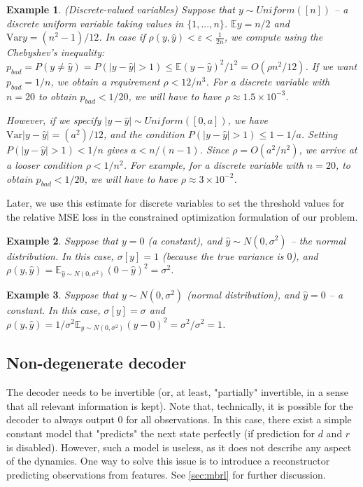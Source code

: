 \documentclass[a4paper,11pt,oneside]{report}
\newtheorem{example}{Example}[section]
\newcommand{\var}{\mbox{Var}}
\begin{document}
\begin{example}{(Discrete-valued variables)}
    Suppose that $y\sim Uniform([n])$ -- a discrete uniform variable taking values in $\{1,...,n\}$. $\mathbb Ey=n/2$ and $\var y=(n^2-1)/12$. In case if $\rho(y,\hat{y})<\varepsilon<\frac{1}{2n}$, we compute using the Chebyshev's inequality: $p_{bad}=P(y\neq \hat{y})=P(|y-\hat{y}|>1)\leq \mathbb E(y-\hat{y})^2/1^2=O(\rho n^2/12)$. If we want $p_{bad}=1/n$, we obtain a requirement $\rho<12/n^3$. For a discrete variable with $n=20$ to obtain $p_{bad}<1/20$, we will have to have $\rho\approx1.5\times 10^{-3}$.

    However, if we specify $|y-\hat{y}|\sim Uniform([0, a])$, we have $\var |y-\hat{y}|=(a^2)/12$, and the condition $P(|y-\hat{y}|>1)\leq 1-1/a$. Setting $P(|y-\hat{y}|>1)<1/n$ gives $a<n/(n-1)$. Since $\rho=O(a^2/n^2)$, we arrive at a looser condition $\rho< 1/n^2$. For example, for a discrete variable with $n=20$, to obtain $p_{bad}<1/20$, we will have to have $\rho\approx 3\times 10^{-2}$.
\end{example}

Later, we use this estimate for discrete variables to set the threshold values for the relative MSE loss in the constrained optimization formulation of our problem.

\begin{example}
    Suppose that $y=0$ (a constant), and $\hat{y}\sim N(0, \sigma^2)$ -- the normal distribution. In this case, $\sigma[y]=1$ (because the true variance is $0$), and $\rho(y, \hat{y})=\mathbb E_{\hat{y}\sim N(0, \sigma^2)}(0-\hat{y})^2=\sigma^2$.
\end{example}

\begin{example}
    Suppose that $y\sim N(0, \sigma^2)$ (normal distribution), and $\hat{y}=0$ -- a constant. In this case, $\sigma[y]=\sigma$ and $\rho(y, \hat{y})= 1/\sigma^2 \mathbb E_{y\sim N(0, \sigma^2)}(y-0)^2=\sigma^2/\sigma^2=1$.
\end{example}

\subsection{Non-degenerate decoder}
The decoder needs to be invertible (or, at least, "partially" invertible, in a sense that all relevant information is kept). Note that, technically, it is possible for the decoder to always output $0$ for all observations. In this case, there exist a simple constant model that "predicts" the next state perfectly (if prediction for $d$ and $r$ is disabled). However, such a model is useless, as it does not describe any aspect of the dynamics. One way to solve this issue is to introduce a reconstructor predicting observations from features. See \autoref{sec:mbrl} for further discussion.
\end{document}
